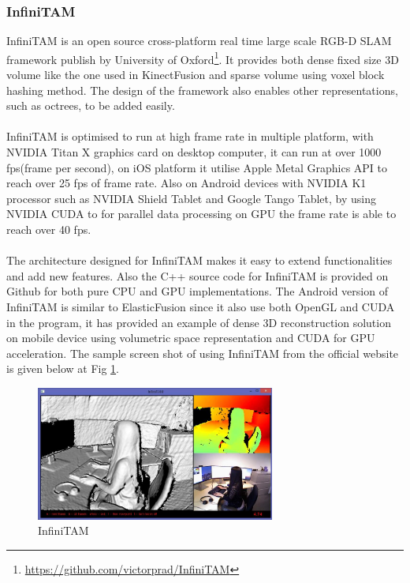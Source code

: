 \documentclass[12pt,twoside]{article}
\begin{document}
\subsubsection{InfiniTAM}
InfiniTAM\citep{InfiniTAM_ISMAR_2015} is an open source cross-platform real time large scale RGB-D SLAM framework publish by University of Oxford\footnote{\url{https://github.com/victorprad/InfiniTAM}}. It provides both dense fixed size 3D volume like the one used in KinectFusion\citep{newcombe2011kinectfusion} and sparse volume using voxel block hashing method\citep{niessner2013real}. The design of the framework also enables other representations, such as octrees, to be added easily.\\
\\
InfiniTAM is optimised to run at high frame rate in multiple platform, with NVIDIA Titan X graphics card on desktop computer, it can run at over 1000 fps(frame per second), on iOS platform it utilise Apple Metal Graphics API to reach over 25 fps of frame rate. Also on Android devices with NVIDIA K1 processor such as NVIDIA Shield Tablet and Google Tango Tablet, by using NVIDIA CUDA to for parallel data processing on GPU the frame rate is able to reach over 40 fps.\\
\\
The architecture designed for InfiniTAM makes it easy to extend functionalities and add new features. Also the C++ source code for InfiniTAM is provided on Github for both pure CPU and GPU implementations. The Android version of InfiniTAM is similar to ElasticFusion since it also use both OpenGL and CUDA in the program, it has provided an example of dense 3D reconstruction solution on mobile device using volumetric space representation and CUDA for GPU acceleration. The sample screen shot of using InfiniTAM from the official website is given below at Fig \ref{fig: InfiniTAM}.\\
\begin{figure}[h]
    \centering
    \includegraphics[width=0.7\textwidth]{figures/InfiniTAM}
    \caption{InfiniTAM}
    \label{fig: InfiniTAM}
\end{figure}
\end{document}
